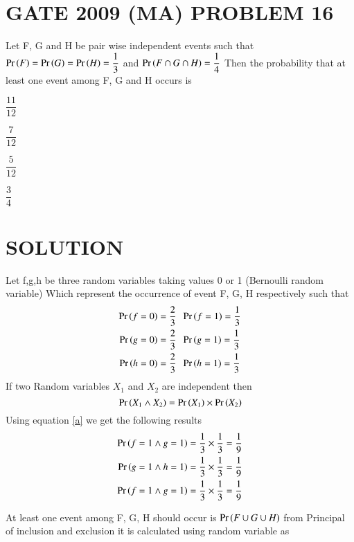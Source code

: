 \documentclass[journal,12pt,twocolumn]{IEEEtran}
\begin{document}
\section{GATE 2009 (MA) PROBLEM 16} 
Let F, G and H be pair wise independent events such that $\Pr\left(F\right)=\Pr\left(G\right)=\Pr\left(H\right)=\dfrac{1}{3}$ 
and $\Pr\left(F \cap G \cap H\right)=\dfrac{1}{4}$ Then the probability that at least one event among F, G and H occurs is 
\begin{enumerate}[(A)]
\begin{multicols}{4}
\setlength\itemsep{2em}
\item $\dfrac{11}{12}$
\item $\dfrac{7}{12}$
\item $\dfrac{5}{12}$
\item $\dfrac{3}{4}$
\end{multicols}
\end{enumerate}

\section{SOLUTION}
Let f,g,h be three random variables taking values 0 or 1 (Bernoulli random variable) Which 
represent the occurrence of event F, G, H respectively such that 
\begin{align*}
\Pr\left(f=0\right) = \dfrac{2}{3}\;&\;\Pr\left(f=1\right) = \dfrac{1}{3} \\
\Pr\left(g=0\right) = \dfrac{2}{3}\;&\;\Pr\left(g=1\right) = \dfrac{1}{3} \\
\Pr\left(h=0\right) = \dfrac{2}{3}\;&\;\Pr\left(h=1\right) = \dfrac{1}{3} \\
\end{align*}
If two Random variables $X_1$ and $X_2$ are independent then 
\begin{equation}
\Pr\left(X_1 \land X_2\right) = \Pr\left(X_1\right) \times \Pr\left(X_2\right) \label{a}
\end{equation}
Using equation \eqref{a} we get the following results 
\begin{align*}
\Pr\left(f=1 \land g=1\right) &= \dfrac{1}{3} \times \dfrac{1}{3} = \dfrac{1}{9} \\
\Pr\left(g=1 \land h=1\right) &= \dfrac{1}{3} \times \dfrac{1}{3} = \dfrac{1}{9} \\
\Pr\left(f=1 \land g=1\right) &= \dfrac{1}{3} \times \dfrac{1}{3} = \dfrac{1}{9} 
\end{align*}

At least one event among F, G, H should occur is $\Pr\left(F\cup G\cup H\right)$ 
from Principal of inclusion and exclusion it is calculated using random variable as
\end{document}
